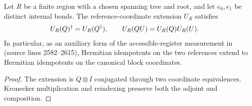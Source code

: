 
\begin{lemma}
    \label{thm:peps_reference_projection_extension}
    \leanok
    Let $R$ be a finite region with a chosen spanning tree and root, and let
    $e_0,e_1$ be distinct internal bonds. The reference-coordinate extension
    $U_R$ satisfies
    \begin{align}
        U_R(Q)^\dagger & =U_R(Q^\dagger),\qquad
        U_R(QU)=U_R(Q)U_R(U).\notag
    \end{align}
    In particular, as an auxiliary form of the accessible-register
    measurement in \cite[Section~6.6]{Schuch2010PEPS} (source lines
    2582--2615), Hermitian idempotents on the two references extend to
    Hermitian idempotents on the canonical block coordinates.
\end{lemma}
\begin{proof}\leanok
    The extension is $Q\otimes I$ conjugated through two coordinate
    equivalences. Kronecker multiplication and reindexing preserve both
    the adjoint and composition.
\end{proof}

